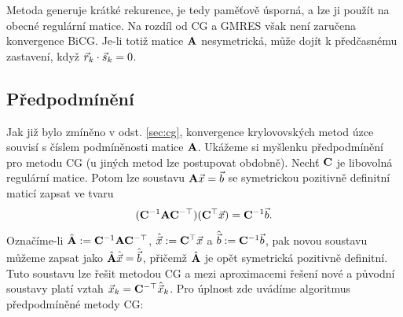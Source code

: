 Metoda generuje krátké rekurence, je tedy paměťově úsporná, a lze ji použít na obecné regulární matice.
Na rozdíl od CG a GMRES však není zaručena konvergence BiCG.
Je-li totiž matice $\mathbf{A}$ nesymetrická, může dojít k předčasnému zastavení, když $\vec{r}_k\cdot\vec{s}_k=0$.



\subsection{Předpodmínění}

Jak již bylo zmíněno v odst. \ref{sec:cg}, konvergence krylovovských metod úzce souvisí s číslem podmíněnosti matice $\mathbf{A}$.
Ukážeme si myšlenku předpodmínění pro metodu CG (u jiných metod lze postupovat obdobně).
Nechť $\mathbf{C}$ je libovolná regulární matice.
Potom lze soustavu $\mathbf{A}\vec{x}=\vec{b}$ se symetrickou pozitivně definitní maticí zapsat ve tvaru
$$ (\mathbf{C}^{-1}\mathbf{A}\mathbf{C}^{-\top})(\mathbf{C}^\top\vec{x})=\mathbf{C}^{-1}\vec{b}. $$
Označíme-li $\hat{\mathbf{A}}:=\mathbf{C}^{-1}\mathbf{A}\mathbf{C}^{-\top}$, $\hat{\vec{x}}:=\mathbf{C}^\top\vec{x}$ a $\hat{\vec{b}}:=\mathbf{C}^{-1}\vec{b}$, pak novou soustavu můžeme zapsat jako $\hat{\mathbf{A}}\hat{\vec{x}}=\hat{\vec{b}}$, přičemž $\hat{\mathbf{A}}$ je opět symetrická pozitivně definitní.
Tuto soustavu lze řešit metodou CG a mezi aproximacemi řešení nové a původní soustavy platí vztah $\vec{x}_k=\mathbf{C}^{-\top}\hat{\vec{x}}_k$.
Pro úplnost zde uvádíme algoritmus předpodmíněné metody CG:


